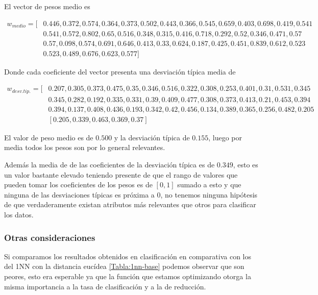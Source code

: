 El vector de pesos medio es 

\begin{align*}
  w_{medio} = [ 
    &  0.446, 0.
    372, 0.574, 0.364, 0.373, 0.502, 0.443, 0.366, 0.545, 0.659, 0.403, 0.698, 0.419, 0.541 \\
    &  0.541, 0.572, 0.802, 0.65, 0.516, 0.348, 0.315, 0.416, 0.718, 0.292, 0.52, 0.346, 0.471, 0.57  \\
    &  0.57, 0.098, 0.574, 0.691, 0.646, 0.413, 0.33, 0.624, 0.187, 0.425, 0.451, 0.839, 0.612, 0.523  \\
    &  0.523, 0.489, 0.676, 0.623, 0.577  
    ]
  \end{align*}
  
  Donde cada coeficiente del vector presenta una desviación típica media de 
  
  \begin{align*}
    w_{desv. tip.} = [ 
      &  0.207, 0.305, 0.373, 0.475, 0.35, 0.346, 0.516, 0.322, 0.308, 0.253, 0.401, 0.31, 0.531, 0.345  \\
      &  0.345, 0.282, 0.192, 0.335, 0.331, 0.39, 0.409, 0.477, 0.308, 0.373, 0.413, 0.21, 0.453, 0.394  \\
      &  0.394, 0.137, 0.408, 0.436, 0.193, 0.342, 0.42, 0.456, 0.134, 0.389, 0.365, 0.256, 0.482, 0.205  \\
      & [0.205, 0.339, 0.463, 0.369, 0.37
     ]
\end{align*}

El valor de peso medio es de $0.500$ y la desviación típica de $0.155$, luego por media todos los pesos son por lo general relevantes. 

Además la media de de las coeficientes de la desviación típica es de $0.349$, esto es un valor bastante elevado teniendo presente de que el rango de valores 
que pueden tomar los coeficientes de los pesos es de $[0,1]$ 
sumado a esto y que ninguna de las desviaciones típicas es
próxima a $0$, no tenemos ninguna hipótesis de que verdaderamente 
existan atributos más relevantes que otros para clasificar los datos.

\subsubsection*{ Otras consideraciones }
Si comparamos los resultados obtenidos en clasificación en comparativa con los del 1NN con la distancia eucídea \ref{Tabla:1nn-base} podemos observar que son peores, esto era esperable ya que la función que estamos optimizando otorga la misma importancia a la tasa de clasificación y a la de reducción.  

